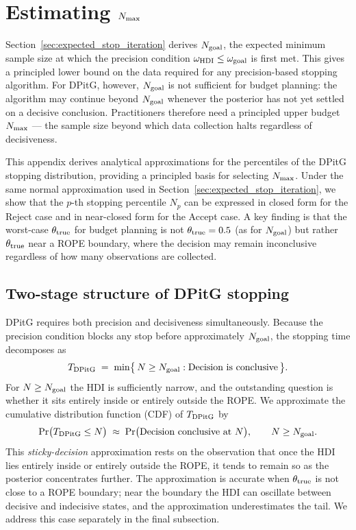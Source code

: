 \section{Estimating $N_{\rm max}$}\label{app:nmax}

Section~\ref{sec:expected_stop_iteration} derives $N_{\rm goal}$, the expected minimum sample
size at which the precision condition $\omega_{\rm HDI} \le \omega_{\rm goal}$ is first met.
This gives a principled lower bound on the data required for any precision-based stopping
algorithm.
For DPitG, however, $N_{\rm goal}$ is not sufficient for budget planning: the algorithm may
continue beyond $N_{\rm goal}$ whenever the posterior has not yet settled on a decisive
conclusion.
Practitioners therefore need a principled upper budget $N_{\rm max}$ --- the sample size
beyond which data collection halts regardless of decisiveness.

This appendix derives analytical approximations for the percentiles of the DPitG stopping
distribution, providing a principled basis for selecting $N_{\rm max}$.
Under the same normal approximation used in Section~\ref{sec:expected_stop_iteration},
we show that the $p$-th stopping percentile $N_p$ can be expressed in closed form for the
Reject case and in near-closed form for the Accept case.
A key finding is that the worst-case $\theta_{\rm true}$ for budget planning is not
$\theta_{\rm true} = 0.5$ (as for $N_{\rm goal}$) but rather $\theta_{\rm true}$ near a ROPE
boundary, where the decision may remain inconclusive regardless of how many observations are
collected.

\subsection*{Two-stage structure of DPitG stopping}

DPitG requires both precision and decisiveness simultaneously.
Because the precision condition blocks any stop before approximately $N_{\rm goal}$,
the stopping time decomposes as
\begin{equation}\label{eq:dpitg_stopping_time}
    T_{\rm DPitG} \;=\; \min\bigl\{\,N \ge N_{\rm goal} : \text{Decision is conclusive}\,\bigr\}.
\end{equation}
For $N \ge N_{\rm goal}$ the HDI is sufficiently narrow, and the outstanding question is
whether it sits entirely inside or entirely outside the ROPE.
We approximate the cumulative distribution function (CDF) of $T_{\rm DPitG}$ by
\begin{equation}\label{eq:dpitg_cdf_approx}
    \Pr\bigl(T_{\rm DPitG} \le N\bigr)
    \;\approx\; \Pr\bigl(\text{Decision conclusive at }N\bigr),
    \qquad N \ge N_{\rm goal}.
\end{equation}
This \textit{sticky-decision} approximation rests on the observation that once the HDI lies
entirely inside or entirely outside the ROPE, it tends to remain so as the posterior
concentrates further.
The approximation is accurate when $\theta_{\rm true}$ is not close to a ROPE boundary;
near the boundary the HDI can oscillate between decisive and indecisive states, and the
approximation underestimates the tail.
We address this case separately in the final subsection.

